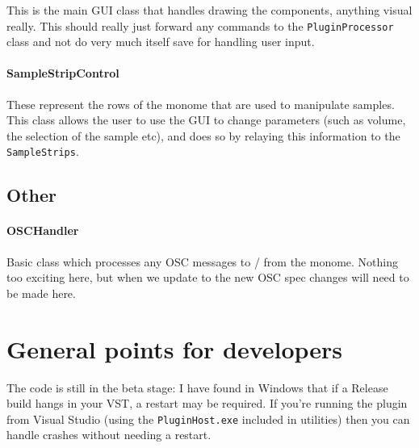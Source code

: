 \documentclass[10pt,a4paper]{report}
\begin{document}
This is the main GUI class that handles drawing the components, anything visual really. This should really just forward any commands to the \texttt{PluginProcessor} class and not do very much itself save for handling user input.

\paragraph{SampleStripControl}

These represent the rows of the monome that are used to manipulate samples. This class allows the user to use the GUI to change parameters (such as volume, the selection of the sample etc), and does so by relaying this information to the \texttt{SampleStrips}.



\subsection{Other}

\paragraph{OSCHandler}

Basic class which processes any OSC messages to / from the monome. Nothing too exciting here, but when we update to the new OSC spec changes will need to be made here.



\section{General points for developers}

The code is still in the beta stage: I have found in Windows that if a Release build hangs in your VST, a restart may be required. If you're running the plugin from Visual Studio (using the \texttt{PluginHost.exe} included in utilities) then you can handle crashes without needing a restart.
\end{document}

